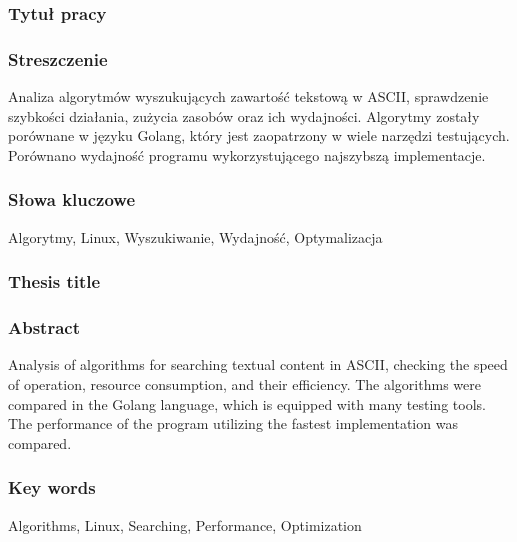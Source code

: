 \subsubsection*{Tytuł pracy} 
\Title

\subsubsection*{Streszczenie}  
Analiza algorytmów wyszukujących zawartość tekstową w ASCII, sprawdzenie 
szybkości działania, zużycia zasobów oraz ich wydajności. Algorytmy zostały 
porównane w języku Golang, który jest zaopatrzony w wiele narzędzi testujących.
Porównano wydajność programu wykorzystującego najszybszą implementacje.

\subsubsection*{Słowa kluczowe} 
Algorytmy, Linux, Wyszukiwanie, Wydajność, Optymalizacja

\subsubsection*{Thesis title} 
\begin{otherlanguage}{british}
\TitleAlt
\end{otherlanguage}

\subsubsection*{Abstract} 
\begin{otherlanguage}{british}
Analysis of algorithms for searching textual content in ASCII, checking the 
speed of operation, resource consumption, and their efficiency. The algorithms 
were compared in the Golang language, which is equipped with many testing tools.
The performance of the program utilizing the fastest implementation was compared.

\end{otherlanguage}
\subsubsection*{Key words}  
\begin{otherlanguage}{british}
Algorithms, Linux, Searching, Performance, Optimization
\end{otherlanguage}

